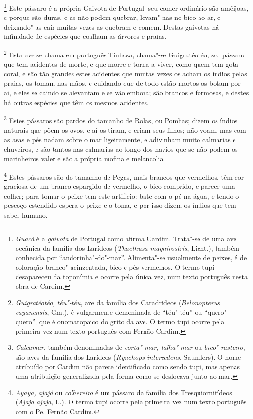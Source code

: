 \footnote{ \textit{Guacá} é a \textit{gaivota} de
Portugal como afirma Cardim. Trata"-se de uma ave oceânica da família
dos Larídeos (\textit{Thaethusa magnirostris}, Licht.), também
conhecida por ``andorinha"-do"-mar''. Alimenta"-se usualmente de peixes, é
de coloração branco"-acinzentada, bico e pés vermelhos. O termo tupi
desapareceu da toponímia e ocorre pela única vez, num texto português
nesta obra de Cardim.} Este pássaro é a própria Gaivota de
Portugal; seu comer ordinário são amêijoas, e porque são duras, e as
não podem quebrar, levam"-nas no bico ao ar, e deixando"-as cair muitas
vezes as quebram e comem. Destas gaivotas há infinidade de espécies que
coalham as árvores e praias.

\footnote{ \textit{Guigratéotéo, téu"-téu}, ave
da família dos Caradrídeos (\textit{Belonopterus cayanensis}, Gm.), é
vulgarmente denominada de ``téu"-téu'' ou ``quero"-quero'', que é
onomatopaico do grito da ave. O termo tupi ocorre pela primeira vez num
texto português com Fernão Cardim.} Esta ave se chama em
português Tinhosa, chama"-se Guigratéotéo, sc.~pássaro que tem
acidentes de morte, e que morre e torna a viver, como quem tem gota
coral, e são tão grandes estes acidentes que muitas vezes os acham os
índios pelas praias, os tomam nas mãos, e cuidando que de todo estão
mortos os botam por aí, e eles se caindo se alevantam e se vão embora;
são brancos e formosos, e destes há outras espécies que têm os mesmos acidentes.

\footnote{ \textit{Calcamar}, também denominadas de
\textit{corta"-mar, talha"-mar} ou \textit{bico"-rasteiro}, são aves da
família dos Larídeos (\textit{Rynchops intercedens}, Saunders). O nome
atribuído por Cardim não parece identificado como sendo tupi, mas
apenas uma atribuição generalizada pela forma como se deslocava junto
ao mar.} Estes pássaros são pardos do tamanho de Rolas, ou
Pombas; dizem os índios naturais que põem os ovos, e aí os tiram, e
criam seus filhos; não voam, mas com as asas e pés nadam sobre o mar
ligeiramente, e adivinham muito calmarias e chuveiros, e são tantos nas
calmarias ao longo dos navios que se não podem os marinheiros valer e
são a própria mofina e melancolia.

\footnote{ \textit{Ayaya, ajajá} ou \textit{colhereiro}
é um pássaro da família dos Tresquiornitídeos (\textit{Ajaja
ajaja}, L.). O termo tupi ocorre pela primeira vez num texto português
com o Pe. Fernão Cardim.} Estes pássaros são do tamanho de
Pegas, mais brancos que vermelhos, têm cor graciosa de um branco
espargido de vermelho, o bico comprido, e parece uma colher; para tomar
o peixe tem este artifício: bate com o pé na água, e tendo o pescoço
estendido espera o peixe e o toma, e por isso dizem os índios que tem
saber humano.

